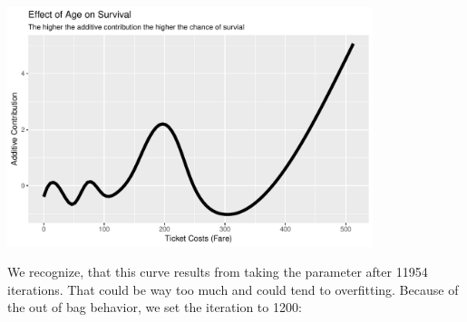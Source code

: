 \documentclass[]{article}
\begin{document}
\begin{center}\includegraphics[width=0.8\textwidth]{usecase_pdf_files/figure-latex/unnamed-chunk-30-1} \end{center}

We recognize, that this curve results from taking the parameter after
11954 iterations. That could be way too much and could tend to
overfitting. Because of the out of bag behavior, we set the iteration to
1200:
\end{document}
